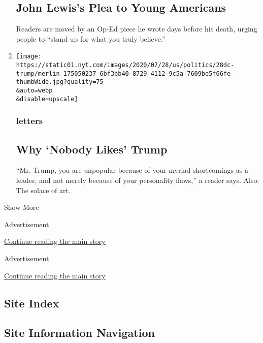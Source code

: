 \begin{enumerate}
  \hypertarget{john-lewiss-plea-to-young-americans}{%
  \subsection{John Lewis's Plea to Young
  Americans}\label{john-lewiss-plea-to-young-americans}}

  Readers are moved by an Op-Ed piece he wrote days before his death,
  urging people to ``stand up for what you truly believe.''
\item
  \href{/2020/07/30/opinion/letters/trump-personality.html}{}

  \texttt{[image: https://static01.nyt.com/images/2020/07/28/us/politics/28dc-trump/merlin\_175050237\_6bf3bb40-8729-4112-9c5a-7609be5f66fe-thumbWide.jpg?quality=75\\\&auto=webp\\\&disable=upscale]}

  \hypertarget{letters-3}{%
  \subsubsection{letters}\label{letters-3}}

  \hypertarget{why-nobody-likes-trump}{%
  \subsection{Why `Nobody Likes' Trump}\label{why-nobody-likes-trump}}

  ``Mr. Trump, you are unpopular because of your myriad shortcomings as
  a leader, and not merely because of your personality flaws,'' a reader
  says. Also: The solace of art.
\end{enumerate}

Show More

Advertisement

\protect\hyperlink{after-mid2}{Continue reading the main story}

Advertisement

\protect\hyperlink{after-mktg}{Continue reading the main story}

\hypertarget{site-index}{%
\subsection{Site Index}\label{site-index}}

\hypertarget{site-information-navigation}{%
\subsection{Site Information
Navigation}\label{site-information-navigation}}

